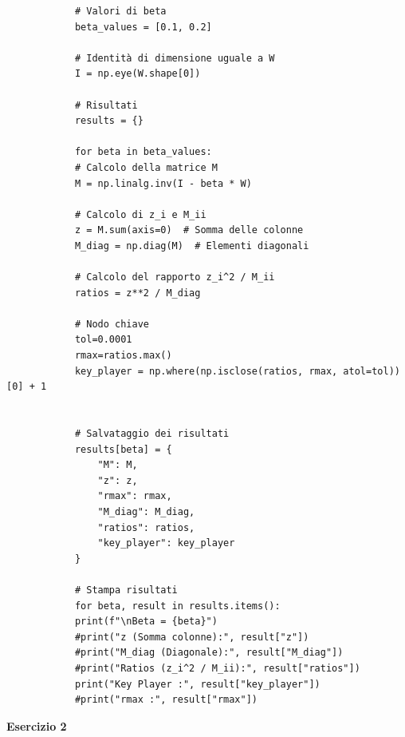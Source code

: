\documentclass[a4paper,12pt]{article}
\begin{document}
\begin{itemize}
\begin{verbatim}
			# Valori di beta
			beta_values = [0.1, 0.2]
			
			# Identità di dimensione uguale a W
			I = np.eye(W.shape[0])
			
			# Risultati
			results = {}
			
			for beta in beta_values:
			# Calcolo della matrice M
			M = np.linalg.inv(I - beta * W)
			
			# Calcolo di z_i e M_ii
			z = M.sum(axis=0)  # Somma delle colonne
			M_diag = np.diag(M)  # Elementi diagonali
			
			# Calcolo del rapporto z_i^2 / M_ii
			ratios = z**2 / M_diag
			
			# Nodo chiave
			tol=0.0001
			rmax=ratios.max()
			key_player = np.where(np.isclose(ratios, rmax, atol=tol))[0] + 1
			
			
			# Salvataggio dei risultati
			results[beta] = {
				"M": M,
				"z": z,
				"rmax": rmax,
				"M_diag": M_diag,
				"ratios": ratios,
				"key_player": key_player   
			}
			
			# Stampa risultati
			for beta, result in results.items():
			print(f"\nBeta = {beta}")
			#print("z (Somma colonne):", result["z"])
			#print("M_diag (Diagonale):", result["M_diag"])
			#print("Ratios (z_i^2 / M_ii):", result["ratios"])
			print("Key Player :", result["key_player"])
			#print("rmax :", result["rmax"])
		\end{verbatim}
	\end{itemize}
	\centering \textbf{Esercizio 2}\\
\end{document}
